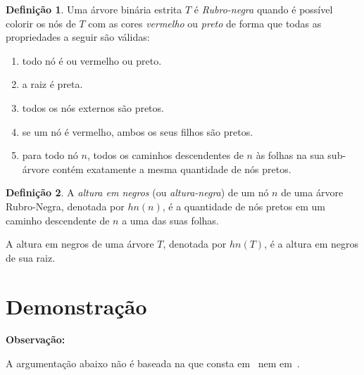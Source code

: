 \documentclass[11pt,twoside]{article}
\theoremstyle{definition}
\newtheorem{definition}{Definição}[section]
\begin{document}
\begin{definition}
	Uma árvore binária estrita \( T \) é \emph{Rubro-negra} quando é possível colorir os nós de \( T \) com as cores \emph{vermelho} ou \emph{preto} de forma que todas as propriedades a seguir são válidas:
	\begin{enumerate}[label=(\alph*)]
		\item todo nó é ou vermelho ou preto.
		\item a raiz é preta.
		\item todos os nós externos são pretos.
		\item se um nó é vermelho, ambos os seus filhos são pretos.
		\item para todo nó \( n \), todos os caminhos descendentes de \( n \) às folhas na sua sub-árvore contém exatamente a mesma quantidade de nós pretos.
	\end{enumerate}
\end{definition}

\begin{definition}
	A \emph{altura em negros} (ou \emph{altura-negra}) de um nó \( n \) de uma árvore Rubro-Negra, denotada por \( hn(n) \), é a quantidade de nós pretos em um caminho descendente de \( n \) a uma das suas folhas.

	A altura em negros de uma árvore \( T \), denotada por \( hn(T) \), é a altura em negros de sua raiz.
\end{definition}

\section{Demonstração}

\begin{framed}
	{\bfseries Observação:}

	A argumentação abaixo não é baseada na que consta em~\textcite{Szwarcfiter2010} nem em~\textcite{Cormen2009}.
\end{framed}
\end{document}
